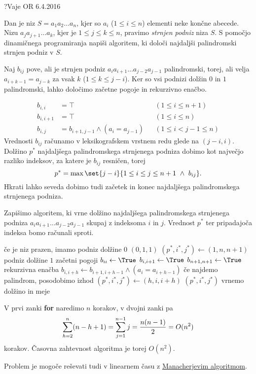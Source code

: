 \begin{naloga}{?}{Vaje OR 6.4.2016}
\begin{vprasanje}
Dan je niz $S = a_1 a_2 \dots a_n$,
kjer so $a_i$ ($1 \le i \le n$) elementi neke končne abecede.
Nizu $a_j a_{j+1} \dots a_k$, kjer je $1 \le j \le k \le n$,
pravimo {\em strnjen podniz} niza $S$.
S pomočjo dinamičnega programiranja napiši algoritem,
ki določi najdaljši palindromski strnjen podniz v $S$.
\end{vprasanje}

\begin{odgovor}
Naj $b_{ij}$ pove,
ali je strnjen podniz $a_i a_{i+1} \dots a_{j-2} a_{j-1}$ palindromski,
torej, ali velja $a_{i+k-1} = a_{j-k}$ za vsak $k$ ($1 \le k \le j-i$).
Ker so vsi podnizi dolžin $0$ in $1$ palindromski,
lahko določimo začetne pogoje in rekurzivno enačbo.

\needspace{\baselineskip}
\begin{align*}
b_{i,i} &= \top && (1 \le i \le n+1) \\
b_{i,i+1} &= \top && (1 \le i \le n) \\
b_{i,j} &= b_{i+1,j-1} \land (a_i = a_{j-1}) && (1 \le i < j-1 \le n)
\end{align*}
Vrednosti $b_{ij}$ računamo v leksikografskem vrstnem redu
glede na $(j-i, i)$.
Dolžino $p^*$ najdaljšega palindromskega strnjenega podniza
dobimo kot največjo razliko indeksov,
za katere je $b_{ij}$ resničen, torej
$$
p^* = \max\set{j-i}{1 \le i \le j \le n+1 \ \land \ b_{ij}} .
$$
Hkrati lahko seveda dobimo tudi začetek in konec
najdaljšega palindromskega strnjenega podniza.

Zapišimo algoritem,
ki vrne dolžino najdaljšega palindromskega strnjenega podniza
$a_i a_{i+1} \dots a_{j-2} a_{j-1}$ skupaj z indeksoma $i$ in $j$.
Vrednost $p^*$ ter pripadajoča indeksa bomo računali sproti.
\begin{small}
\begin{algorithmic}
     \hfill če je niz prazen, imamo podniz dolžine $0$
        \State \Return $(0, 1, 1)$
    \EndIf
    \State $(p^*, i^*, j^*) \gets (1, n, n+1)$ \hfill podniz dolžine $1$
     \hfill začetni pogoji
        \State $b_{ii} \gets \True$
        \State $b_{i,i+1} \gets \True$
    \EndFor
    \State $b_{n+1,n+1} \gets \True$
     \hfill rekurzivna enačba
            \State $b_{i,i+h} \gets b_{i+1,i+h-1} \land (a_i = a_{i+h-1})$
             \hfill če najdemo palindrom, posodobimo izhod
                \State $(p^*, i^*, j^*) \gets (h, i, i+h)$
            \EndIf
        \EndFor
    \EndFor
    \State \Return $(p^*, i^*, j^*)$ \hfill vrnemo dolžino in meje
\EndFunction
\end{algorithmic}
\end{small}
V prvi zanki {\bf for} naredimo $n$ korakov,
v dvojni zanki pa
$$
\sum_{h=2}^n (n-h+1) = \sum_{j=1}^{n-1} j = {n(n-1) \over 2} = O(n^2)
$$
korakov.
Časovna zahtevnost algoritma je torej $O(n^2)$.

Problem je mogoče reševati tudi v linearnem času z
\href{https://en.wikipedia.org/wiki/Longest_palindromic_substring#%
Manacher's_algorithm}{Manacherjevim algoritmom}.
\end{odgovor}
\end{naloga}

